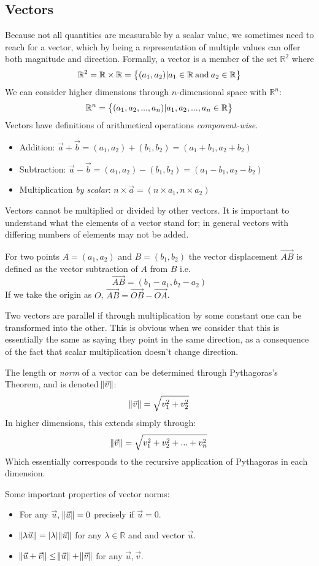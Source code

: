 \documentclass[12pt]{report}
\newcommand{\R}{\mathbb{R}}
\begin{document}
\begin{flushleft}
\section*{Vectors}
Because not all quantities are measurable by a scalar value, we sometimes need
to reach for a vector, which by being a representation of multiple values can 
offer both magnitude and direction. Formally, a vector is a member of the set 
\(\R^2\) where
\[\R^2 = \R \times \R = \set{(a_1, a_2) | a_1 \in \R \:\mathrm{and}\: 
a_2 \in \R}\]
We can consider higher dimensions through \(n\)-dimensional space 
with \(\R^n\):
\[\R^n = \set{(a_1, a_2, ..., a_n) | a_1, a_2, ..., a_n \in \R}\]
Vectors have definitions of arithmetical operations \textit{component-wise}.
\begin{itemize}
    \item Addition: \(\vec{a} + \vec{b} = (a_1, a_2) + (b_1, b_2) = 
    (a_1 + b_1, a_2 + b_2)\)
    \item Subtraction: \(\vec{a} - \vec{b} = (a_1, a_2) - (b_1, b_2) = 
    (a_1 - b_1, a_2 - b_2)\)
    \item Multiplication \textit{by scalar}: \(n \times \vec{a} = 
    (n \times a_1, n \times a_2)\)
\end{itemize}
Vectors cannot be multiplied or divided by other vectors. It is important to 
understand what the elements of a vector stand for; in general vectors with 
differing numbers of elements may not be added.

\bigskip
For two points \(A = (a_1, a_2)\) and \(B = (b_1, b_2)\) the vector 
displacement \(\vec{AB}\) is defined as the vector subtraction of \(A\) 
from \(B\) i.e.
\[\vec{AB} = (b_1 - a_1, b_2 - a_2)\]
If we take the origin as \(O\), \(\vec{AB} = \vec{OB} - \vec{OA}\).

\bigskip
Two vectors are parallel if through multiplication by some constant one can
be transformed into the other. This is obvious when we consider that this is 
essentially the same as saying they point in the same direction, as a 
consequence of the fact that scalar multiplication doesn't change direction.

\bigskip
The length or \textit{norm} of a vector can be determined through Pythagoras's 
Theorem, and is denoted \(\norm{\vec{v}}\):
\[\norm{\vec{v}} = \sqrt{v_1^2 + v_2^2}\]
In higher dimensions, this extends simply through:
\[\norm{\vec{v}} = \sqrt{v_1^2 + v_2^2 + ... + v_n^2}\]
Which essentially corresponds to the recursive application of Pythagoras in each
dimension.

\bigskip
Some important properties of vector norms:
\begin{itemize}
    \item For any \(\vec{u}\), \(\norm{\vec{u}} = 0\) precisely if 
    \(\vec{u} = 0\).
    \item \(\norm{\lambda\vec{u}} = |\lambda|\norm{\vec{u}}\) for any 
    \(\lambda\in\R\) and and vector \(\vec{u}\).
    \item \(\norm{\vec{u} + \vec{v}} \leq \norm{\vec{u}} + \norm{\vec{v}}\) 
    for any \(\vec{u}, \vec{v}\).
\end{itemize}


\end{flushleft}
\end{document}

